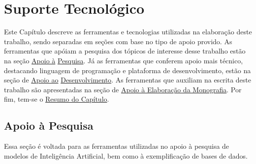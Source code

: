 \chapter[Suporte Tecnológico]{Suporte Tecnológico}\label{chap:suptec}

Este Capítulo descreve as ferramentas e tecnologias utilizadas na elaboração deste trabalho, sendo separadas
em seções com base no tipo de apoio provido. As ferramentas que apóiam a pesquisa dos tópicos de interesse desse 
trabalho estão na seção
\hyperref[sec:apoiopesquisa]{Apoio à} \hyperref[sec:apoiopesquisa]{Pesquisa}. Já as ferramentas que conferem apoio mais técnico, destacando linguagem
de programação e plataforma de desenvolvimento, estão na seção de \hyperref[sec:apoiodev]{Apoio ao} \hyperref[sec:apoiodev]{Desenvolvimento}.
As ferramentas que auxiliam na escrita deste trabalho são apresentadas na seção de \hyperref[sec:elaboracaomono]
{Apoio à Elaboração da Monografia}. Por fim, tem-se o \hyperref[sec:resumosuptec]
{Resumo do Capítulo}.

\section{Apoio à Pesquisa}\label{sec:apoiopesquisa}
Essa seção é voltada para as ferramentas utilizadas no apoio à pesquisa de modelos de Inteligência Artificial, bem
como à exemplificação de bases de dados.

